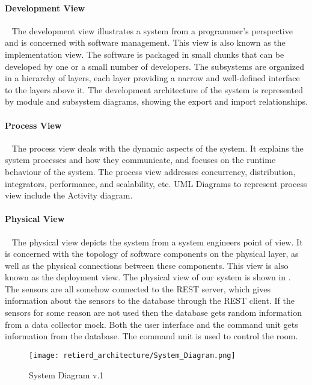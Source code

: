 \documentclass[../document]{subfiles}
\begin{document}
\paragraph{Development View} \ \newline
The development view illustrates a system from a programmer's perspective and is concerned with software management. This view is also known as the implementation view. The software is packaged in small chunks that can be developed by one or a small number of developers. The subsystems are organized in a hierarchy of layers, each layer providing a narrow and well-defined interface to the layers above it. The development architecture of the system is represented by module and subsystem diagrams, showing the export and import relationships. 
 

\paragraph{Process View} \ \newline
The process view deals with the dynamic aspects of the system. It explains the system processes and how they communicate, and focuses on the runtime behaviour of the system. The process view addresses concurrency, distribution, integrators, performance, and scalability, etc. UML Diagrams to represent process view include the Activity diagram.


\paragraph{Physical View} \ \newline
The physical view depicts the system from a system engineers point of view. It is concerned with the topology of software components on the physical layer, as well as the physical connections between these components. This view is also known as the deployment view. The physical view of our system is shown in .  The sensors are all somehow connected to the \gls{REST} server, which gives information about the sensors to the database through the \gls{REST} client. If the sensors for some reason are not used then the database gets random information from a data collector mock. Both the user interface and the command unit gets information from the database. The command unit is used to control the room. 

\begin{figure}[H]
	\centering
	\texttt{[image: retierd\_architecture/System\_Diagram.png]}
	\caption{System Diagram v.1}
	\label{fig:System_Diagram}
\end{figure}
\end{document}
